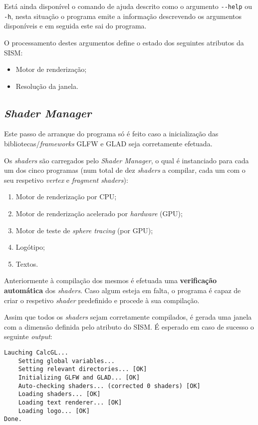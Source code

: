 Está ainda disponível o comando de ajuda descrito como o argumento \verb|--help| ou \verb|-h|, nesta situação o programa emite a informação descrevendo os argumentos disponíveis e em seguida este sai do programa.

O processamento destes argumentos define o estado dos seguintes atributos da \ac{SISM}:
\begin{itemize}[nosep]
    \item Motor de renderização;
    \item Resolução da janela.
\end{itemize}


\subsection{\textit{Shader Manager}}
\label{ssec::impl:estrutura:shaders}

Este passo de arranque do programa só é feito caso a inicialização das bibliotecas/\textit{frameworks} GLFW e \ac{GLAD} seja corretamente efetuada.

Os \textit{shaders} são carregados pelo \textit{Shader Manager}, o qual é instanciado para cada um dos cinco programas (num total de dez \textit{shaders} a compilar, cada um com o seu respetivo \textit{vertex} e \textit{fragment shaders}):

\begin{enumerate}[nosep]
	\item Motor de renderização por \acs{CPU};
	\item Motor de renderização acelerado por \textit{hardware} (\acs{GPU});
	\item Motor de teste de \textit{sphere tracing} (por \acs{GPU});
	\item Logótipo;
	\item Textos.
\end{enumerate}

Anteriormente à compilação dos mesmos é efetuada uma \textbf{verificação automática} dos \textit{shaders}. Caso algum esteja em falta, o programa é capaz de criar o respetivo \textit{shader} predefinido e procede à sua compilação.

Assim que todos os \textit{shaders} sejam corretamente compilados, é gerada uma janela com a dimensão definida pelo atributo do \ac{SISM}. É esperado em caso de sucesso o seguinte \textit{output}:

\begin{verbatim}
Lauching CalcGL...
    Setting global variables...     
    Setting relevant directories... [OK]
    Initializing GLFW and GLAD... [OK]
    Auto-checking shaders... (corrected 0 shaders) [OK]
    Loading shaders... [OK]
    Loading text renderer... [OK]
    Loading logo... [OK]
Done.
\end{verbatim}


